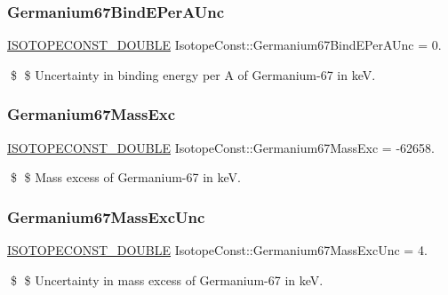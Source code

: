 \subsubsection{\texorpdfstring{Germanium67\+Bind\+E\+Per\+A\+Unc}{Germanium67BindEPerAUnc}}
{\footnotesize\ttfamily \mbox{\hyperlink{group___isotope_const-_macros_ga8f45a7272ce02c0b4c65c44636ed719a}{I\+S\+O\+T\+O\+P\+E\+C\+O\+N\+S\+T\+\_\+\+D\+O\+U\+B\+LE}} Isotope\+Const\+::\+Germanium67\+Bind\+E\+Per\+A\+Unc = 0.}

\$ \$ Uncertainty in binding energy per A of Germanium-\/67 in keV. \mbox{\label{group___isotope_const-_germanium-_ge67_gae5ce7d8fdd04dc08b011a82e87ffc02f}} 
\subsubsection{\texorpdfstring{Germanium67\+Mass\+Exc}{Germanium67MassExc}}
{\footnotesize\ttfamily \mbox{\hyperlink{group___isotope_const-_macros_ga8f45a7272ce02c0b4c65c44636ed719a}{I\+S\+O\+T\+O\+P\+E\+C\+O\+N\+S\+T\+\_\+\+D\+O\+U\+B\+LE}} Isotope\+Const\+::\+Germanium67\+Mass\+Exc = -\/62658.}

\$ \$ Mass excess of Germanium-\/67 in keV. \mbox{\label{group___isotope_const-_germanium-_ge67_gaf29cbbcfd220fb0a5720e265ffd16c7f}} 
\subsubsection{\texorpdfstring{Germanium67\+Mass\+Exc\+Unc}{Germanium67MassExcUnc}}
{\footnotesize\ttfamily \mbox{\hyperlink{group___isotope_const-_macros_ga8f45a7272ce02c0b4c65c44636ed719a}{I\+S\+O\+T\+O\+P\+E\+C\+O\+N\+S\+T\+\_\+\+D\+O\+U\+B\+LE}} Isotope\+Const\+::\+Germanium67\+Mass\+Exc\+Unc = 4.}

\$ \$ Uncertainty in mass excess of Germanium-\/67 in keV. \mbox{\label{group___isotope_const-_germanium-_ge67_gab32f1a34d6d76ba099d584b73e8857f6}} 
